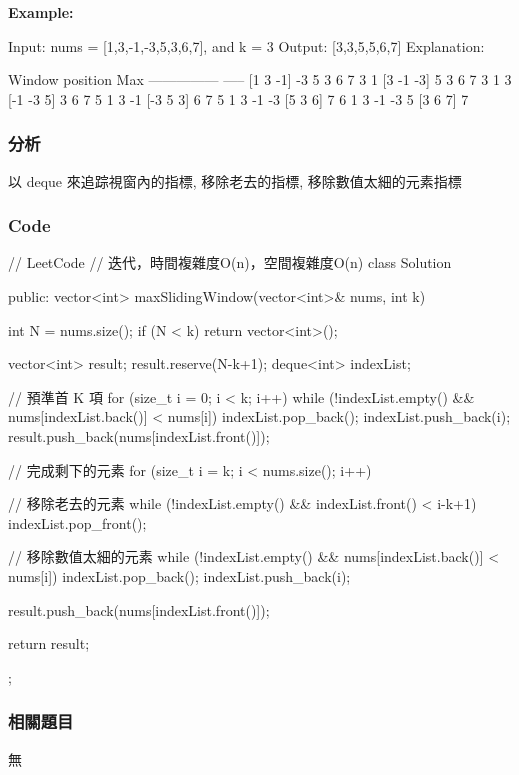 \textbf{Example:}
\begin{Code}
Input: nums = [1,3,-1,-3,5,3,6,7], and k = 3
Output: [3,3,5,5,6,7]
Explanation:

Window position                Max
---------------               -----
[1  3  -1] -3  5  3  6  7       3
 1 [3  -1  -3] 5  3  6  7       3
 1  3 [-1  -3  5] 3  6  7       5
 1  3  -1 [-3  5  3] 6  7       5
 1  3  -1  -3 [5  3  6] 7       6
 1  3  -1  -3  5 [3  6  7]      7
\end{Code}


\subsubsection{分析}
以 deque 來追踪視窗內的指標, 移除老去的指標, 移除數值太細的元素指標


\subsubsection{Code}
\begin{Code}
// LeetCode
// 迭代，時間複雜度O(n)，空間複雜度O(n)
class Solution {
public:
    vector<int> maxSlidingWindow(vector<int>& nums, int k) {
        int N = nums.size();
        if (N < k) return vector<int>();

        vector<int> result; result.reserve(N-k+1);
        deque<int> indexList;

        // 預準首 K 項
        for (size_t i = 0; i < k; i++)
        {
            while (!indexList.empty() && nums[indexList.back()] < nums[i])
                indexList.pop_back();
            indexList.push_back(i);
        }
        result.push_back(nums[indexList.front()]);

        // 完成剩下的元素
        for (size_t i = k; i < nums.size(); i++)
        {
            // 移除老去的元素
            while (!indexList.empty() && indexList.front() < i-k+1)
                indexList.pop_front();

            // 移除數值太細的元素
            while (!indexList.empty() && nums[indexList.back()] < nums[i])
                indexList.pop_back();
            indexList.push_back(i);

            result.push_back(nums[indexList.front()]);
        }

        return result;
    }
};
\end{Code}


\subsubsection{相關題目}
\begindot
\item 無
\myenddot
